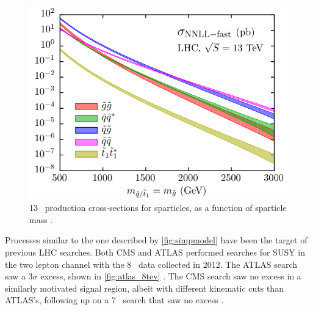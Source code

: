 \begin{centering}
\begin{figure}[!hbt]
\myfloatalign
\includegraphics[width=.9\linewidth]{figures/theory/nnllfast_wpresc_total.pdf}
\caption{ 13 \tev~production cross-sections for sparticles, as a function of sparticle mass \cite{1607.07741}.}
\label{fig:gluino_xs}
\end{figure}
\end{centering}


Processes similar to the one described by \autoref{fig:simpmodel} have been the target of previous \ac{LHC} searches. Both \ac{CMS} and ATLAS performed searches for \ac{SUSY} in the two lepton channel with the 8 \tev~data collected in 2012. The ATLAS search saw a 3$\sigma$ excess, shown in \autoref{fig:atlas_8tev} \cite{SUSY-2014-10}. The \ac{CMS} search saw no excess in a similarly motivated signal region, albeit with different kinematic cuts than ATLAS's, following up on a 7 \tev~search that saw no excess \cite{Chatrchyan:2012qka, CMS2}. 

